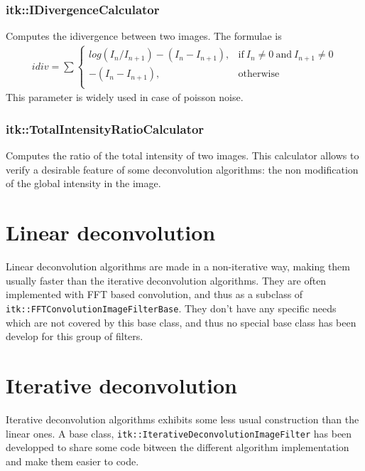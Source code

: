 \documentclass{InsightArticle}
\begin{document}
\subsubsection{itk::IDivergenceCalculator}

Computes the idivergence between two images.
The formulae is 
\begin{eqnarray}
\label{eq:imageFormation}
idiv = \sum 
\begin{cases} 
  log( I_n/I_{n+1} ) - ( I_n - I_{n+1} ),  & \text{if}~ I_n \ne 0 ~\text{and}~ I_{n+1} \ne 0 \\
  - ( I_n - I_{n+1} ),  & \text{otherwise} \\
\end{cases}
\end{eqnarray}
This parameter is widely used in case of poisson noise.

\subsubsection{itk::TotalIntensityRatioCalculator}

Computes the ratio of the total intensity of two images. This calculator allows to verify a desirable feature of some deconvolution
algorithms: the non modification of the global intensity in the image.

\section{Linear deconvolution}

Linear deconvolution algorithms are made in a non-iterative way, making them usually faster than the iterative deconvolution algorithms.
They are often implemented with FFT based convolution, and thus as a subclass of \verb$itk::FFTConvolutionImageFilterBase$. They don't
have any specific needs which are not covered by this base class, and thus no special base class has been develop for this group
of filters.

\section{Iterative deconvolution}

Iterative deconvolution algorithms exhibits some less usual construction than the linear ones. A base class, \verb$itk::IterativeDeconvolutionImageFilter$
has been developped to share some code bitween the different algorithm implementation and make them easier to code.
\end{document}
